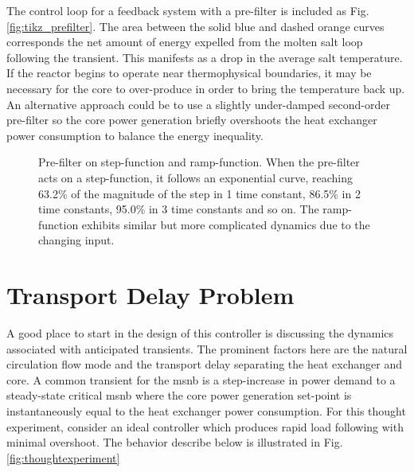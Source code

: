The control loop for a feedback system with a pre-filter is included as Fig. \ref{fig:tikz_prefilter}. The area between the solid blue and dashed orange curves corresponds the net amount of energy expelled from the molten salt loop following the transient. This manifests as a drop in the average salt temperature. If the reactor begins to operate near thermophysical boundaries, it may be necessary for the core to over-produce in order to bring the temperature back up. An alternative approach could be to use a slightly under-damped second-order pre-filter so the core power generation briefly overshoots the heat exchanger power consumption to balance the energy inequality.

\begin{figure}[!ht]
    \centering
    \qquad
    \caption[Pre-filter on (a) step-function and (b) ramp-function]{Pre-filter on step-function and ramp-function. When the pre-filter acts on a step-function, it follows an exponential curve, reaching 63.2\% of the magnitude of the step in 1 time constant, 86.5\% in 2 time constants, 95.0\% in 3 time constants and so on. The ramp-function exhibits similar but more complicated dynamics due to the changing input.}
    \label{fig:pgf_prefilter}
\end{figure}

\section{Transport Delay Problem} \label{sec:transport}
A good place to start in the design of this controller is discussing the dynamics associated with anticipated transients. The prominent factors here are the natural circulation flow mode and the transport delay separating the heat exchanger and core. A common transient for the \acs{msnb} is a step-increase in power demand to a steady-state critical \acs{msnb} where the core power generation set-point is instantaneously equal to the heat exchanger power consumption. For this thought experiment, consider an ideal controller which produces rapid load following with minimal overshoot. The behavior describe below is illustrated in Fig. \ref{fig:thoughtexperiment}

